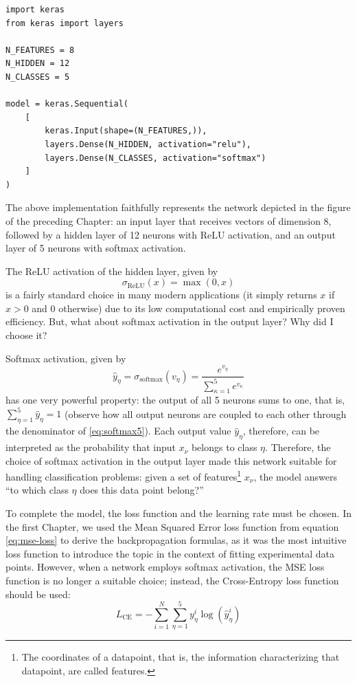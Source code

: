 \documentclass[11pt,a4paper,oneside]{book}
\theoremstyle{definition}
\theoremstyle{plain}
\theoremstyle{remark}
\begin{document}
\vspace{10pt}
\begin{lstlisting}
import keras
from keras import layers

N_FEATURES = 8
N_HIDDEN = 12
N_CLASSES = 5

model = keras.Sequential(
    [
        keras.Input(shape=(N_FEATURES,)),
        layers.Dense(N_HIDDEN, activation="relu"),
        layers.Dense(N_CLASSES, activation="softmax")
    ]
)
\end{lstlisting}
\vspace{10pt}

The above implementation faithfully represents the network depicted in the figure of the preceding Chapter: an input layer that receives vectors of dimension 8, followed by a hidden layer of 12 neurons with ReLU activation, and an output layer of 5 neurons with softmax activation.

The ReLU activation of the hidden layer, given by
\begin{equation}
    \sigma_\text{ReLU}(x) = \max(0,x)
\end{equation}
is a fairly standard choice in many modern applications (it simply returns $x$ if $x>0$ and $0$ otherwise) due to its low computational cost and empirically proven efficiency. But, what about softmax activation in the output layer? Why did I choose it?

Softmax activation, given by
\begin{equation}
    \label{eq:softmax5}
    \hat y_\eta=\sigma_\text{softmax}(v_\eta) = \frac{e^{v_\eta}}{\sum^5_{\kappa=1} e^{v_\kappa}}
\end{equation}
has one very powerful property: the output of all 5 neurons sums to one, that is, $\sum_{\eta=1}^5\hat y_\eta=1$ (observe how all output neurons are coupled to each other through the denominator of \eqref{eq:softmax5}). Each output value $\hat y_\eta$, therefore, can be interpreted as the probability that input $x_\nu$ belongs to class $\eta$. Therefore, the choice of softmax activation in the output layer made this network suitable for handling classification problems: given a set of features\footnote{The coordinates of a datapoint, that is, the information characterizing that datapoint, are called features.} $x_\nu$, the model answers ``to which class $\eta$ does this data point belong?''

To complete the model, the loss function and the learning rate must be chosen. In the first Chapter, we used the Mean Squared Error loss function from equation \eqref{eq:mse-loss} to derive the backpropagation formulas, as it was the most intuitive loss function to introduce the topic in the context of fitting experimental data points. However, when a network employs softmax activation, the MSE loss function is no longer a suitable choice; instead, the Cross-Entropy loss function should be used:
\begin{equation}
    \label{eq:Lce}
    L_\text{CE} = -\sum_{i=1}^N\sum^5_{\eta=1} y^i_\eta\log(\hat y^i_\eta)
\end{equation}
\end{document}
